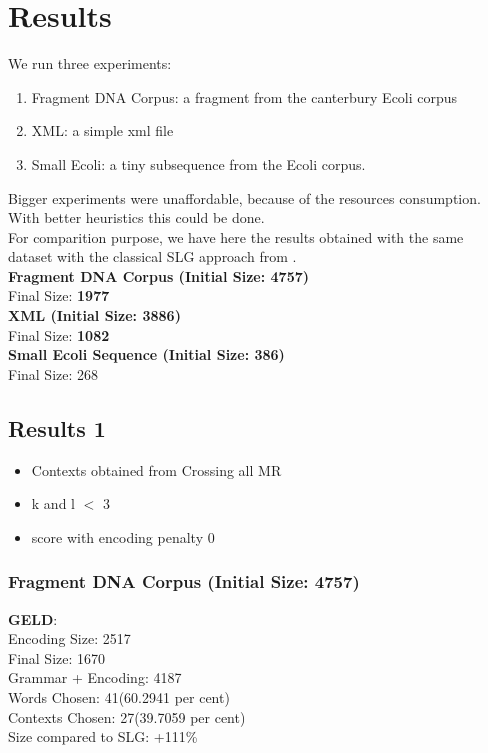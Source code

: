 \chapter{Results}

We run three experiments: 
\begin{enumerate}
	\item Fragment DNA Corpus: a fragment from the canterbury Ecoli corpus
	\item XML: a simple xml file
	\item Small Ecoli: a tiny subsequence from the Ecoli corpus.
\end{enumerate}

Bigger experiments were unaffordable, because of the resources consumption. With
better heuristics this could be done.\\

For comparition purpose, we have here the results obtained with the same dataset
with the classical SLG approach from \cite{GThesis}. \\

\textbf{Fragment DNA Corpus (Initial Size: 4757)}\\
Final Size: \textbf{1977} \\

\textbf{XML (Initial Size: 3886)}\\
Final Size: \textbf{1082} \\

\textbf{Small Ecoli Sequence (Initial Size: 386)}\\
Final Size: 268\\

\newpage
\section{Results 1}

\begin{itemize}
	\item Contexts obtained from Crossing all MR
	\item k and l $<$ 3
	\item score with encoding penalty 0
\end{itemize}

\subsection{Fragment DNA Corpus (Initial Size: 4757) }
\textbf{GELD}:\\
Encoding Size: 2517 \\
Final Size: 1670 \\
Grammar + Encoding: 4187 \\
Words Chosen: 41(60.2941 per cent) \\
Contexts Chosen: 27(39.7059 per cent) \\
Size compared to SLG:  +111\% \\

